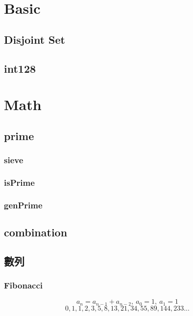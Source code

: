 

\section{Basic}

\subsection{Disjoint Set}


\subsection{int128}


\section{Math}

\subsection{prime}
\subsubsection{sieve}


\subsubsection{isPrime}


\subsubsection{genPrime}


\subsection{combination}


\subsection{數列}
\subsubsection{Fibonacci}
\[a_{n} = a_{n-1} + a_{n-2},\ a_0 = 1,\ a_1 = 1\]
\[0, 1, 1, 2, 3, 5, 8, 13, 21, 34, 55, 89, 144, 233...\]

